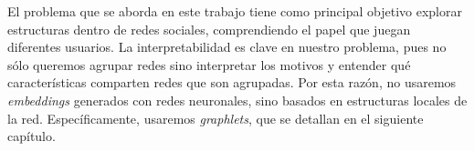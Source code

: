 El problema que se aborda en este trabajo tiene como principal objetivo explorar estructuras dentro de redes sociales, comprendiendo el papel que juegan diferentes usuarios. La interpretabilidad es clave en nuestro problema, pues no sólo queremos agrupar redes sino interpretar los motivos y entender qué características comparten redes que son agrupadas. Por esta razón, no usaremos {\it embeddings} generados con redes neuronales, sino basados en estructuras locales de la red. Específicamente, usaremos {\it graphlets}, que se detallan en el siguiente capítulo. 